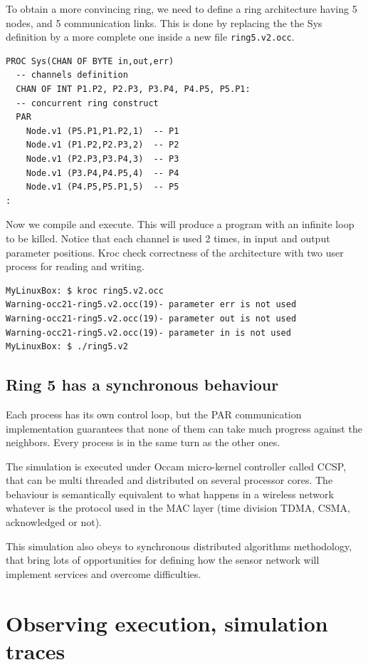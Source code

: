 \documentclass[times,a4paper]{book}
\begin{document}
To obtain a more convincing ring, we need to define a ring architecture having
5 nodes, and 5 communication links.
This is done by replacing the the Sys definition by a more complete one
inside a new file  {\tt ring5.v2.occ}.


\begin{lstlisting}  
PROC Sys(CHAN OF BYTE in,out,err)
  -- channels definition
  CHAN OF INT P1.P2, P2.P3, P3.P4, P4.P5, P5.P1:
  -- concurrent ring construct
  PAR
    Node.v1 (P5.P1,P1.P2,1)  -- P1
    Node.v1 (P1.P2,P2.P3,2)  -- P2
    Node.v1 (P2.P3,P3.P4,3)  -- P3
    Node.v1 (P3.P4,P4.P5,4)  -- P4
    Node.v1 (P4.P5,P5.P1,5)  -- P5
:
\end{lstlisting} 

Now we compile and execute. This will produce a program with an infinite loop
to be killed. Notice that each channel is used 2 times,  in   input and output parameter
positions. Kroc check correctness of the architecture with two user process for
reading and writing.

\begin{lstlisting}  
MyLinuxBox: $ kroc ring5.v2.occ
Warning-occ21-ring5.v2.occ(19)- parameter err is not used
Warning-occ21-ring5.v2.occ(19)- parameter out is not used
Warning-occ21-ring5.v2.occ(19)- parameter in is not used
MyLinuxBox: $ ./ring5.v2
\end{lstlisting} 

\subsection {Ring 5 has a synchronous behaviour}

Each process has its own control loop, but the PAR communication implementation
guarantees that none of them can take much progress against the neighbors. Every 
process is in the same turn as the other ones.

The simulation is executed under Occam micro-kernel controller called CCSP,
that can be multi threaded and distributed on several processor cores.
The behaviour is semantically equivalent to what happens in a wireless network
whatever is the protocol used in the MAC layer (time division TDMA, CSMA,
acknowledged or not).

This simulation also obeys to synchronous distributed algorithms methodology,
that bring lots of opportunities for defining how the sensor network will
implement services and overcome difficulties.

\section{Observing execution, simulation traces}
\end{document}
